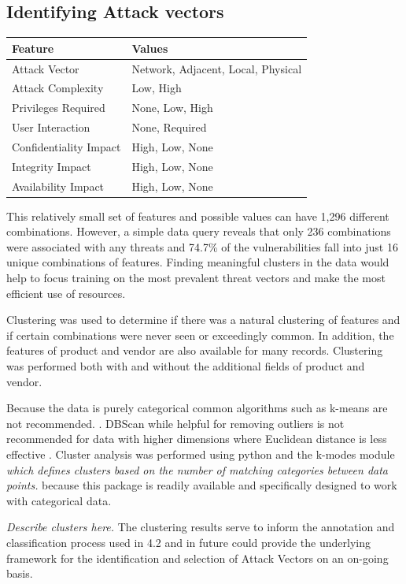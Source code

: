 \documentclass{article} %
\begin{document}
\subsection{Identifying Attack vectors}
\begin{center}
\begin{tabular}{ |l|l| } \hline
Feature & Values\\\hline
Attack Vector & Network, Adjacent, Local, Physical  \\ 
Attack Complexity & Low, High  \\ 
Privileges Required & None, Low, High  \\ 
User Interaction & None, Required  \\ 
Confidentiality Impact & High, Low, None\\
Integrity Impact & High, Low, None\\
Availability Impact & High, Low, None\\
\hline
\end{tabular}
\end{center}


This relatively small set of features and possible values can have 1,296 different combinations.  However, a simple data query reveals that only 236 combinations were associated with any threats and 74.7\% of the vulnerabilities fall into just 16 unique combinations of features. Finding meaningful clusters in the data would help to focus training on the most prevalent threat vectors and make the most efficient use of resources.  

Clustering was used to determine if there was a natural clustering of features and if certain combinations were never seen or exceedingly common. In addition, the features of product and vendor are also available for many records.  Clustering was performed both with and without the additional fields of product and vendor.

Because the data is purely categorical common algorithms such as k-means are not recommended. \cite{}.  DBScan while helpful for removing outliers is not recommended for data with higher dimensions where Euclidean distance is less effective \cite{}.  
Cluster analysis was performed using python and the k-modes module \cite{https://pypi.org/project/kmodes/} \textit{which defines clusters based on the number of matching categories between data points.}   because this package is readily available and specifically designed to work with categorical data.  

\textit{Describe clusters here.
}
The clustering results serve to inform the annotation and classification process used in 4.2 and in future could provide the underlying framework for the identification and selection of Attack Vectors on an on-going basis.
\end{document}
